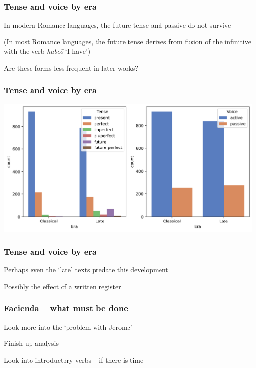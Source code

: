\documentclass{beamer}
\begin{document}
\begin{frame}
\frametitle{Tense and voice by era}
In modern Romance languages, the future tense and passive do not survive

(In most Romance languages, the future tense derives from fusion of the infinitive with the verb \textit{habeō} `I have')

Are these forms less frequent in later works?
\end{frame}

\begin{frame}
\frametitle{Tense and voice by era}
\begin{center}
    \includegraphics[width=\textwidth,height=\textheight,keepaspectratio]{graphs/tense_voice_by_era.png}
\end{center}
\end{frame}

\begin{frame}
\frametitle{Tense and voice by era}
Perhaps even the `late' texts predate this development

Possibly the effect of a written register
\end{frame}

\begin{frame}
\frametitle{Facienda -- what must be done}
Look more into the `problem with Jerome'

Finish up analysis

Look into introductory verbs -- if there is time

\end{frame}
\end{document}
